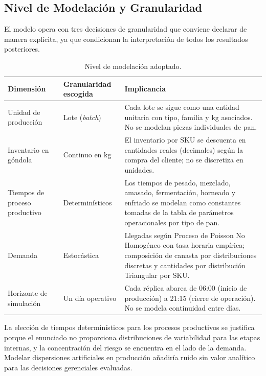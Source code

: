 \documentclass[10pt, a4paper]{article}
\begin{document}
\subsection{Nivel de Modelaci\'on y Granularidad}
\label{ssec:granularidad}

El modelo opera con tres decisiones de granularidad que conviene declarar de
manera expl\'icita, ya que condicionan la interpretaci\'on de todos los
resultados posteriores.

\begin{table}[H]
\centering
\caption{Nivel de modelaci\'on adoptado.}
\label{tab:granularidad}
\renewcommand{\arraystretch}{1.25}
\begin{tabularx}{\textwidth}{>{\raggedright\arraybackslash}p{3.6cm}
                              >{\raggedright\arraybackslash}p{4.0cm}
                              >{\raggedright\arraybackslash}X}
\toprule
\rowcolor{azulClaro}
\textbf{Dimensi\'on} & \textbf{Granularidad escogida} & \textbf{Implicancia} \\
\midrule
Unidad de producci\'on
  & Lote (\textit{batch})
  & Cada lote se sigue como una entidad unitaria con tipo, familia y kg
    asociados. No se modelan piezas individuales de pan. \\
\rowcolor{grisClaro}
Inventario en g\'ondola
  & Continuo en kg
  & El inventario por SKU se descuenta en cantidades reales (decimales) seg\'un
    la compra del cliente; no se discretiza en unidades. \\
Tiempos de proceso productivo
  & Determin\'isticos
  & Los tiempos de pesado, mezclado, amasado, fermentaci\'on, horneado y
    enfriado se modelan como constantes tomadas de la tabla de par\'ametros
    operacionales por tipo de pan. \\
\rowcolor{grisClaro}
Demanda
  & Estoc\'astica
  & Llegadas seg\'un Proceso de Poisson No Homog\'eneo con tasa horaria
    emp\'irica; composici\'on de canasta por distribuciones discretas y
    cantidades por distribuci\'on Triangular por SKU. \\
Horizonte de simulaci\'on
  & Un d\'ia operativo
  & Cada r\'eplica abarca de 06:00 (inicio de producci\'on) a 21:15 (cierre de
    operaci\'on). No se modela continuidad entre d\'ias. \\
\bottomrule
\end{tabularx}
\end{table}

La elecci\'on de tiempos determin\'isticos para los procesos productivos se
justifica porque el enunciado no proporciona distribuciones de variabilidad
para las etapas internas, y la concentraci\'on del riesgo se encuentra en el
lado de la demanda. Modelar dispersiones artificiales en producci\'on a\~nadir\'ia
ruido sin valor anal\'itico para las decisiones gerenciales evaluadas.
\end{document}
